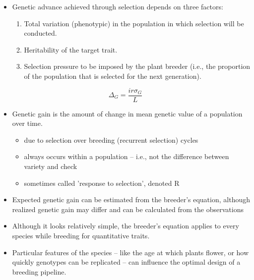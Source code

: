 \documentclass[11pt,ignorenonframetext,aspectratio=169]{beamer}
\providecommand{\tightlist}{%
  \setlength{\itemsep}{0pt}\setlength{\parskip}{0pt}}
\begin{document}
\begin{frame}{}
\protect\hypertarget{section-4}{}
\footnotesize

\begin{itemize}
\tightlist
\item
  Genetic advance achieved through selection depends on three factors:

  \begin{enumerate}
  \footnotesize
  \item Total variation (phenotypic) in the population in which selection will be conducted.
  \item Heritability of the target trait.
  \item Selection pressure to be imposed by the plant breeder (i.e., the proportion of the population that is selected for the next generation).
  \end{enumerate}
\end{itemize}

\[
\Delta_G = \frac{ir\sigma_G}{L}
\]

\begin{itemize}
\tightlist
\item
  Genetic gain is the amount of change in mean genetic value of a
  population over time.

  \begin{itemize}
  \scriptsize
  \item due to selection over breeding (recurrent selection) cycles 
  \item always occurs within a population -- i.e., not the difference between variety and check
  \item sometimes called 'response to selection', denoted R
  \end{itemize}
\item
  Expected genetic gain can be estimated from the breeder's equation,
  although realized genetic gain may differ and can be calculated from
  the observations
\item
  Although it looks relatively simple, the breeder's equation applies to
  every species while breeding for quantitative traits.
\item
  Particular features of the species -- like the age at which plants
  flower, or how quickly genotypes can be replicated -- can influence
  the optimal design of a breeding pipeline.
\end{itemize}
\end{frame}
\end{document}
